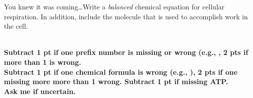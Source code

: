 \question[4]
You knew it was coming\dots Write a \emph{balanced} chemical equation for cellular respiration. In addition, include the molecule that is used to accomplish work in the cell.
 
\\
{\bfseries Subtract 1 pt if one prefix number is missing or wrong (e.g., , 2 pts if more than 1 is wrong. \\
Subtract 1 pt if one chemical formula is wrong (e.g., ), 2 pts if one missing more more than 1 wrong.
Subtract 1 pt if missing ATP.\\Ask me if uncertain.}
\fi 
\vspace*{2\baselineskip}
